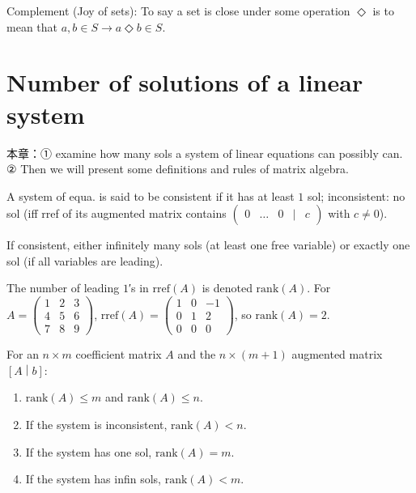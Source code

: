 Complement (Joy of sets): To say a set is close under some operation \(\Diamond\) is to mean that \(a,b \in S\rightarrow a\Diamond b \in S\).

\section{Number of solutions of a linear system}

本章：① examine how many sols a system of linear equations can possibly can. ② Then we will present some definitions and rules of matrix algebra.

A system of equa. is said to be consistent if it has at least \(1\) sol; inconsistent: no sol (iff rref of its augmented matrix contains \(\begin{pmatrix}
0 & \ldots & 0 & | & c
\end{pmatrix}\) with \(c \neq 0\)).

If consistent, either infinitely many sols (at least one free variable) or exactly one sol (if all variables are leading).

\begin{definition}{}

The number of leading \(1\)′s in \(\text{rref}(A)\) is denoted \(\text{rank}(A)\). For \(A = \begin{pmatrix}
1 & 2 & 3 \\
4 & 5 & 6 \\
7 & 8 & 9
\end{pmatrix}\), \(\text{rref}(A) = \begin{pmatrix}
1 & 0 & {- 1} \\
0 & 1 & 2 \\
0 & 0 & 0
\end{pmatrix}\), so \(\text{rank}(A) = 2\).

\end{definition}

For an \(n \times m\) coefficient matrix \(A\) and the \(n \times \left( {m + 1} \right)\) augmented matrix \(\left\lbrack A \middle| b \right\rbrack\):

\begin{enumerate}
\tightlist
\item
  \(\text{rank}(A) \leq m\) and \(\text{rank}(A) \leq n\).
\item
  If the system is inconsistent, \(\text{rank}(A) < n\).
\item
  If the system has one sol, \(\text{rank}(A) = m\).
\item
  If the system has infin sols, \(\text{rank}(A) < m\).
\end{enumerate}

